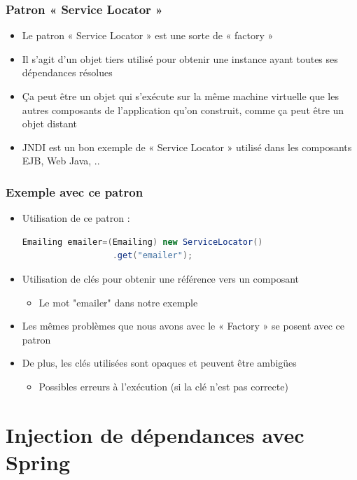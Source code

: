 \documentclass{beamer}
\begin{document}
\begin{frame}[fragile]
  \frametitle{Patron « Service Locator »}  
  \begin{itemize}
  \item Le patron « Service Locator » est une sorte de « factory »
  \item Il s'agit d'un objet tiers utilisé pour obtenir une instance
    ayant toutes ses dépendances résolues
  \item Ça peut être un objet qui s'exécute sur la même machine
    virtuelle que les autres composants de l'application qu'on
    construit, comme ça peut être un objet distant
  \item JNDI est un bon exemple de « Service Locator » utilisé dans
    les composants EJB, Web Java, ..
  \end{itemize}
\end{frame}

\begin{frame}[fragile]
  \frametitle{Exemple avec ce patron}  
  \begin{itemize}
  \item Utilisation de ce patron :
\begin{lstlisting}[language=Java]
Emailing emailer=(Emailing) new ServiceLocator()
                  .get("emailer");
\end{lstlisting}    

\item Utilisation de clés pour obtenir une référence vers un composant
  \begin{itemize}
  \item Le mot "emailer" dans notre exemple
  \end{itemize}
\item Les mêmes problèmes que nous avons avec le « Factory » se posent
  avec ce patron
\item De plus, les clés utilisées sont opaques et peuvent être
  ambigües
  \begin{itemize}
  \item Possibles erreurs à l'exécution (si la clé n'est pas correcte)
  \end{itemize}
\end{itemize}
\end{frame}

\section{Injection de dépendances avec Spring}
\end{document}
